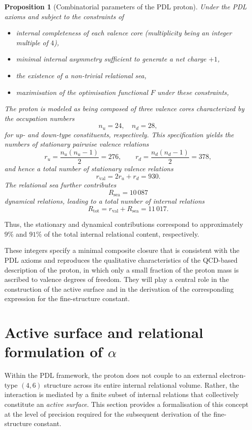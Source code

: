 \documentclass[11pt,a4paper]{article}
\theoremstyle{plain}
\newtheorem{proposition}{Proposition}
\theoremstyle{definition}
\theoremstyle{remark}
\begin{document}
\begin{proposition}[Combinatorial parameters of the PDL proton]
  \label{prop:proton_params}
  Under the PDL axioms and subject to the constraints of
  \begin{itemize}
    \item internal completeness of each valence core (multiplicity being an integer multiple of \(4\)),
    \item minimal internal asymmetry sufficient to generate a net charge \(+1\),
    \item the existence of a non-trivial relational sea,
    \item maximisation of the optimisation functional \(F\) under these constraints,
  \end{itemize}
  The proton is modeled as being composed of three valence cores characterized by the occupation numbers
\[
  n_u = 24, \quad n_d = 28,
\]
for up- and down-type constituents, respectively. This specification yields the numbers of stationary pairwise valence relations
\[
  r_u = \frac{n_u(n_u - 1)}{2} = 276,
  \qquad
  r_d = \frac{n_d(n_d - 1)}{2} = 378,
\]
and hence a total number of stationary valence relations
\[
  r_{\mathrm{val}} = 2 r_u + r_d = 930.
\]
The relational sea further contributes
\[
  R_{\mathrm{sea}} = 10\,087
\]
dynamical relations, leading to a total number of internal relations
\[
  R_{\mathrm{tot}} = r_{\mathrm{val}} + R_{\mathrm{sea}} = 11\,017.
\]
\end{proposition}
Thus, the stationary and dynamical contributions correspond to approximately \(9\%\) and \(91\%\) of the total internal relational content, respectively.

These integers specify a minimal composite closure that is consistent with the PDL axioms and reproduces the qualitative characteristics of the QCD-based description of the proton, in which only a small fraction of the proton mass is ascribed to valence degrees of freedom. They will play a central role in the construction of the active surface and in the derivation of the corresponding expression for the fine-structure constant.

\section{Active surface and relational formulation of \texorpdfstring{\(\alpha\)}{alpha}}

Within the PDL framework, the proton does not couple to an external electron-type \((4,6)\) structure across its entire internal relational volume. Rather, the interaction is mediated by a finite subset of internal relations that collectively constitute an \emph{active surface}. This section provides a formalisation of this concept at the level of precision required for the subsequent derivation of the fine-structure constant.
\end{document}
